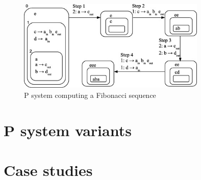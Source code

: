 





\begin{figure}[ht]
  \centering
  \includegraphics[width=0.8\textwidth]{img/p_system_fibonacci.jpg}
  \caption{P system computing a Fibonacci sequence \cite{Buiu201233PSystemFibonacci}}
  \label{fig:p_system_fibonacci}
\end{figure}




\section{P system variants} %
\label{sec:p_system_variants}



\section{Case studies} %
\label{sec:case_studies}



